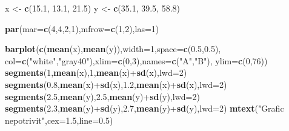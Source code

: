 \documentclass[]{article}
\newenvironment{Shaded}{\begin{snugshade}}{\end{snugshade}}
\newcommand{\KeywordTok}[1]{\textcolor[rgb]{0.13,0.29,0.53}{\textbf{{#1}}}}
\newcommand{\DataTypeTok}[1]{\textcolor[rgb]{0.13,0.29,0.53}{{#1}}}
\newcommand{\DecValTok}[1]{\textcolor[rgb]{0.00,0.00,0.81}{{#1}}}
\newcommand{\FloatTok}[1]{\textcolor[rgb]{0.00,0.00,0.81}{{#1}}}
\newcommand{\StringTok}[1]{\textcolor[rgb]{0.31,0.60,0.02}{{#1}}}
\newcommand{\NormalTok}[1]{{#1}}
\begin{document}
\begin{Shaded}
\begin{Highlighting}[]
\NormalTok{x <-}\StringTok{ }\KeywordTok{c}\NormalTok{(}\FloatTok{15.1}\NormalTok{, }\FloatTok{13.1}\NormalTok{, }\FloatTok{21.5}\NormalTok{)}
\NormalTok{y <-}\StringTok{ }\KeywordTok{c}\NormalTok{(}\FloatTok{35.1}\NormalTok{, }\FloatTok{39.5}\NormalTok{, }\FloatTok{58.8}\NormalTok{)}

\KeywordTok{par}\NormalTok{(}\DataTypeTok{mar=}\KeywordTok{c}\NormalTok{(}\DecValTok{4}\NormalTok{,}\DecValTok{4}\NormalTok{,}\DecValTok{2}\NormalTok{,}\DecValTok{1}\NormalTok{),}\DataTypeTok{mfrow=}\KeywordTok{c}\NormalTok{(}\DecValTok{1}\NormalTok{,}\DecValTok{2}\NormalTok{),}\DataTypeTok{las=}\DecValTok{1}\NormalTok{)}

\KeywordTok{barplot}\NormalTok{(}\KeywordTok{c}\NormalTok{(}\KeywordTok{mean}\NormalTok{(x),}\KeywordTok{mean}\NormalTok{(y)),}\DataTypeTok{width=}\DecValTok{1}\NormalTok{,}\DataTypeTok{space=}\KeywordTok{c}\NormalTok{(}\FloatTok{0.5}\NormalTok{,}\FloatTok{0.5}\NormalTok{),}
        \DataTypeTok{col=}\KeywordTok{c}\NormalTok{(}\StringTok{"white"}\NormalTok{,}\StringTok{"gray40"}\NormalTok{),}\DataTypeTok{xlim=}\KeywordTok{c}\NormalTok{(}\DecValTok{0}\NormalTok{,}\DecValTok{3}\NormalTok{),}\DataTypeTok{names=}\KeywordTok{c}\NormalTok{(}\StringTok{"A"}\NormalTok{,}\StringTok{"B"}\NormalTok{),}
        \DataTypeTok{ylim=}\KeywordTok{c}\NormalTok{(}\DecValTok{0}\NormalTok{,}\DecValTok{76}\NormalTok{))}
\KeywordTok{segments}\NormalTok{(}\DecValTok{1}\NormalTok{,}\KeywordTok{mean}\NormalTok{(x),}\DecValTok{1}\NormalTok{,}\KeywordTok{mean}\NormalTok{(x)+}\KeywordTok{sd}\NormalTok{(x),}\DataTypeTok{lwd=}\DecValTok{2}\NormalTok{)}
\KeywordTok{segments}\NormalTok{(}\FloatTok{0.8}\NormalTok{,}\KeywordTok{mean}\NormalTok{(x)+}\KeywordTok{sd}\NormalTok{(x),}\FloatTok{1.2}\NormalTok{,}\KeywordTok{mean}\NormalTok{(x)+}\KeywordTok{sd}\NormalTok{(x),}\DataTypeTok{lwd=}\DecValTok{2}\NormalTok{)}
\KeywordTok{segments}\NormalTok{(}\FloatTok{2.5}\NormalTok{,}\KeywordTok{mean}\NormalTok{(y),}\FloatTok{2.5}\NormalTok{,}\KeywordTok{mean}\NormalTok{(y)+}\KeywordTok{sd}\NormalTok{(y),}\DataTypeTok{lwd=}\DecValTok{2}\NormalTok{)}
\KeywordTok{segments}\NormalTok{(}\FloatTok{2.3}\NormalTok{,}\KeywordTok{mean}\NormalTok{(y)+}\KeywordTok{sd}\NormalTok{(y),}\FloatTok{2.7}\NormalTok{,}\KeywordTok{mean}\NormalTok{(y)+}\KeywordTok{sd}\NormalTok{(y),}\DataTypeTok{lwd=}\DecValTok{2}\NormalTok{)}
\KeywordTok{mtext}\NormalTok{(}\StringTok{"Grafic nepotrivit"}\NormalTok{,}\DataTypeTok{cex=}\FloatTok{1.5}\NormalTok{,}\DataTypeTok{line=}\FloatTok{0.5}\NormalTok{)}


\end{Highlighting}
\end{Shaded}
\end{document}
